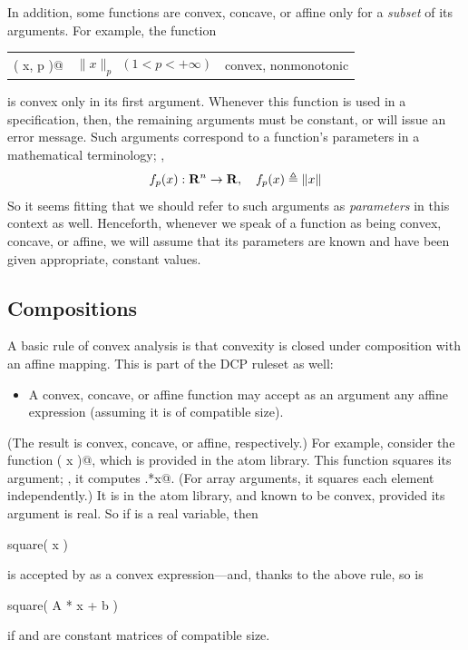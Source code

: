 \documentclass[12pt]{article}
\begin{document}
In addition, some functions are convex, concave, or affine only for 
a \emph{subset} of its arguments. For example, the function
\begin{center}
\begin{tabular}{lll}
	\verb@norm( x, p )@ & $\|x\|_p~~(1<p<+\infty)$ & convex, nonmonotonic
\end{tabular}
\end{center}
is convex only in its first argument. Whenever this function is used
in a \cvx specification, then, the remaining
arguments must be constant, or \cvx will issue an error message. Such arguments
correspond to a function's parameters in a mathematical terminology; \eg,
\begin{equation*}
	f_p(x):\R^n\rightarrow\R, \quad f_p(x) \triangleq \|x\|
\end{equation*}
So it seems fitting that we should refer to such arguments as \emph{parameters}
in this context as well. Henceforth, whenever we speak of a \cvx function
as being convex, concave, or affine, we will assume that its parameters are
known and have been given appropriate, constant values.

\subsection{Compositions}
\label{sec:compositions}

A basic rule of convex analysis is that convexity is closed under 
composition with an affine mapping. 
This is part of the DCP ruleset as well:
\begin{itemize}
\item A convex, concave, or affine function may accept as an argument
any affine expression (assuming it is of compatible size).
\end{itemize}
(The result is convex, concave, or affine, respectively.)
For example, consider the function \verb@square( x )@, which is provided
in the \cvx atom library. 
This function squares its argument; \ie, it computes
\verb@x.*x@. 
(For array arguments, it squares each element independently.)
It is in the \cvx atom library, and known to be convex, provided its
argument is real.  So if \verb@x@ is a real variable, then
\begin{code}
	square( x )
\end{code}
is accepted by \cvx as a convex expression---and, thanks to
the above rule, so is
\begin{code}
	square( A * x + b )
\end{code}
if \verb@A@ and \verb@b@ are constant matrices of compatible size.
\end{document}
